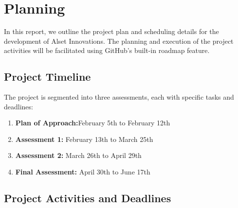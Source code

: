 \section{Planning}





In this report, we outline the project plan and scheduling details for the development of Alset Innovations. The planning and execution of the project activities will be facilitated using GitHub's built-in roadmap feature. 

\subsection*{Project Timeline}

The project is segmented into three assessments, each with specific tasks and deadlines:

\begin{enumerate}
    \item \textbf{Plan of Approach:}February 5th to February 12th
    \item \textbf{Assessment 1:} February 13th to March 25th
    \item \textbf{Assessment 2:} March 26th to April 29th
    \item \textbf{Final Assessment:} April 30th to June 17th
\end{enumerate}

\subsection*{Project Activities and Deadlines}

